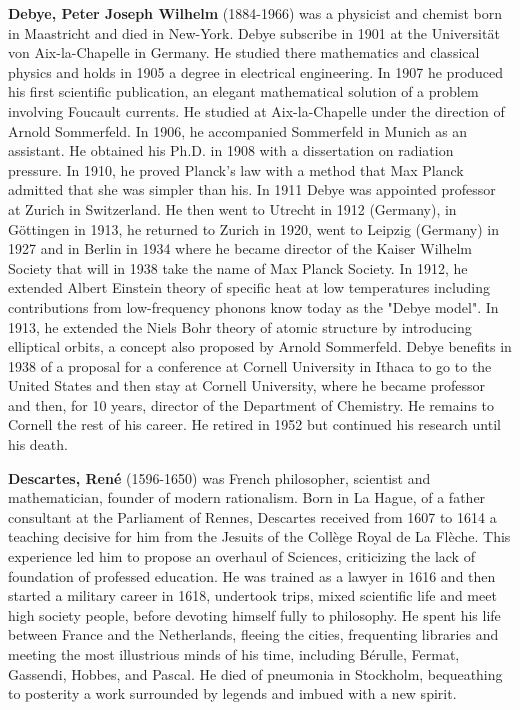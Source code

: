 \textbf{Debye, Peter Joseph Wilhelm }(1884-1966) was a  physicist and chemist born in Maastricht and died in New-York. Debye subscribe in 1901 at the Universität von Aix-la-Chapelle in Germany. He studied there mathematics and classical physics and holds in 1905 a degree in electrical engineering. In 1907 he produced his first scientific publication, an elegant mathematical solution of a problem involving Foucault currents. He studied at Aix-la-Chapelle under the direction of Arnold Sommerfeld. In 1906, he accompanied Sommerfeld in Munich as an assistant. He obtained his Ph.D. in 1908 with a dissertation on radiation pressure. In 1910, he proved Planck's law with a method that Max Planck admitted that she was simpler than his. In 1911 Debye was appointed professor at Zurich in Switzerland. He then went to Utrecht in 1912 (Germany), in Göttingen in 1913, he returned to Zurich in 1920, went to Leipzig (Germany) in 1927 and in Berlin in 1934 where he became director of the Kaiser Wilhelm Society that will in 1938 take the name of Max Planck Society. In 1912, he extended Albert Einstein theory of specific heat at low temperatures including contributions from low-frequency phonons know today as the "Debye model". In 1913, he extended the Niels Bohr theory of atomic structure by introducing elliptical orbits, a concept also proposed by Arnold Sommerfeld. Debye benefits in 1938 of a proposal for a conference at Cornell University in Ithaca to go to the United States and then stay at Cornell University, where he became professor and then, for 10 years, director of the Department of Chemistry. He remains to Cornell the rest of his career. He retired in 1952 but continued his research until his death.

\textbf{Descartes, René} (1596-1650) was French philosopher,  scientist and mathematician, founder of modern rationalism. Born in La Hague, of a father consultant at the Parliament of Rennes, Descartes received from 1607 to 1614 a teaching decisive for him from the Jesuits of the Collège Royal de La Flèche. This experience led him to propose an overhaul of Sciences, criticizing the lack of foundation of professed education. He was trained as a lawyer in 1616 and then started a military career in 1618, undertook trips, mixed scientific life and meet high society people, before devoting himself fully to philosophy. He spent his life between France and the Netherlands, fleeing the cities, frequenting libraries and meeting the most illustrious minds of his time, including Bérulle, Fermat, Gassendi, Hobbes, and Pascal. He died of pneumonia in Stockholm, bequeathing to posterity a work surrounded by legends and imbued with a new spirit.

